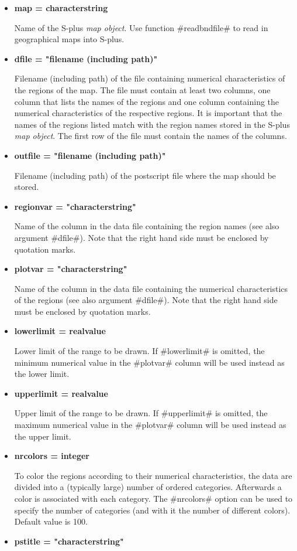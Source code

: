 \begin{itemize}
\item {\bf map = characterstring}

Name of the S-plus {\em map object}. Use function #readbndfile# to
read in geographical maps into S-plus.
\item {\bf dfile = "filename (including path)"}

Filename (including path) of the file containing numerical
characteristics of the regions of the map. The file must contain
at least two columns, one column that lists the names of the
regions and one column containing the numerical characteristics of
the respective regions. It is important that the names of the
regions listed match with the region names stored in the S-plus
{\em map object}. The first row of the file must contain the names
of the columns.
\item {\bf outfile = "filename (including path)"}

Filename (including path) of the postscript file where the map
should be stored.
\item {\bf regionvar = "characterstring"}

Name of the column in the data file containing the region names
(see also argument #dfile#). Note that the right hand side must be
enclosed by quotation marks.
\item {\bf plotvar = "characterstring"}

Name of the column in the data file containing the numerical
characteristics of the regions (see also argument #dfile#). Note
that the right hand side must be enclosed by quotation marks.
\item {\bf lowerlimit = realvalue}

Lower limit of the range to be drawn. If #lowerlimit# is omitted,
the minimum numerical value in the #plotvar# column will be used
instead as the lower limit.
\item {\bf upperlimit = realvalue}

Upper limit of the range to be drawn. If #upperlimit# is omitted,
the maximum numerical value in the #plotvar# column will be used
instead as the upper limit.
\item {\bf nrcolors = integer}

To color the regions according to their numerical characteristics,
the data are divided into a (typically large) number of ordered
categories. Afterwards a color is associated with each category.
The #nrcolors# option can be used to specify the number of
categories (and with it the number of different colors). Default
value is 100.
\item {\bf pstitle = "characterstring"}


\end{itemize}

